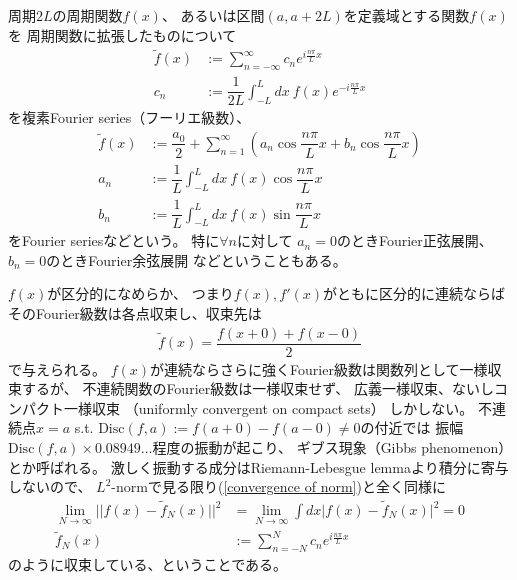 周期$2L$の周期関数$f(x)$、
あるいは区間$(a, a + 2L)$を定義域とする関数$f(x)$を
周期関数に拡張したものについて
\begin{subequations}
\begin{align}
    \tilde{f}(x)
    &:=
    \sum_{n=-\infty}^\infty
    c_n e^{ i\frac{n \pi}{L}x }
\\
    c_n
    &:=
    \dfrac{1}{2L} \int_{-L}^L dx\ 
    f(x) e^{ - i\frac{n \pi}{L}x }
\end{align}
\end{subequations}
を複素Fourier series（フーリエ級数）、
\begin{subequations}
\begin{align}
    \tilde{f}(x)
    &:=
    \dfrac{a_0}{2}
    +
    \sum_{n=1}^\infty
    \left(
        a_n \cos \dfrac{n \pi}{L}x
        +
        b_n \cos \dfrac{n \pi}{L}x
    \right)
\\
    a_n
    &:=
    \dfrac{1}{L} \int_{-L}^L dx\ 
    f(x) \cos\dfrac{n \pi}{L}x
\\
    b_n
    &:=
    \dfrac{1}{L} \int_{-L}^L dx\ 
    f(x) \sin\dfrac{n \pi}{L}x
\end{align}
\end{subequations}
をFourier seriesなどという。
特に$\forall n$に対して
$a_n = 0$のときFourier正弦展開、
$b_n = 0$のときFourier余弦展開
などということもある。

$f(x)$が区分的になめらか、
つまり$f(x), f'(x)$がともに区分的に連続ならば
そのFourier級数は各点収束し、収束先は
\begin{align}
    \tilde{f}(x) = \dfrac{f(x+0) + f(x-0)}{2}
\end{align}
で与えられる。
$f(x)$が連続ならさらに強くFourier級数は関数列として一様収束するが、
不連続関数のFourier級数は一様収束せず、
広義一様収束、ないしコンパクト一様収束
（uniformly convergent on compact sets）
しかしない。
不連続点$x = a$ s.t.
$\mathrm{Disc}(f,a) := f(a+0) - f(a-0) \neq 0$の付近では
振幅$\mathrm{Disc}(f,a) \times 0.08949\dots$程度の振動が起こり、
ギブス現象（Gibbs phenomenon）とか呼ばれる。
激しく振動する成分はRiemann-Lebesgue lemmaより積分に寄与しないので、
$L^2$-normで見る限り(\ref{convergence of norm})と全く同様に
\begin{subequations}
\begin{align}
    \lim_{N\to\infty}\bigg|\bigg|
        f(x) - \tilde{f}_N(x)
    \bigg|\bigg|^2
    &=
    \lim_{N\to\infty}\int dx
    \Big| f(x) - \tilde{f}_N(x) \Big|^2
    = 0
\\
    \tilde{f}_N(x)
    &:=
    \sum_{n=-N}^N
    c_n e^{ i\frac{n \pi}{L}x }
\end{align}
\end{subequations}
のように収束している、ということである。

